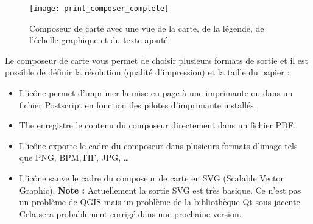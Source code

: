 \begin{figure}[ht]
   \begin{center}
\smallskip
   \texttt{[image: print\_composer\_complete]}
   \caption{Composeur de carte avec une vue de la carte, de la légende, de
l'échelle graphique et du texte ajouté \nixcaption}
   \label{fig:print_composer_complete}
\end{center}
\end{figure}

Le composeur de carte vous permet de choisir plusieurs formats de sortie et il est possible de définir la résolution (qualité d'impression) et la taille du papier :

\begin{itemize}[label=--]
\item L'icône   permet d'imprimer la mise en page à une imprimante ou dans un fichier Postscript en fonction des pilotes d'imprimante installés.
\item The  enregistre le contenu du composeur directement dans un fichier PDF.
\item L'icône  exporte le cadre du composeur dans plusieurs formats d'image tels que PNG, BPM,TIF, JPG, \dots

\item L'icône  sauve le cadre du composeur de carte en SVG (Scalable Vector Graphic). \textbf{Note :} Actuellement la sortie SVG est très basique. Ce n'est pas un problème de QGIS mais un problème de la bibliothèque Qt sous-jacente. Cela sera
probablement corrigé dans une prochaine version. \end{itemize}

